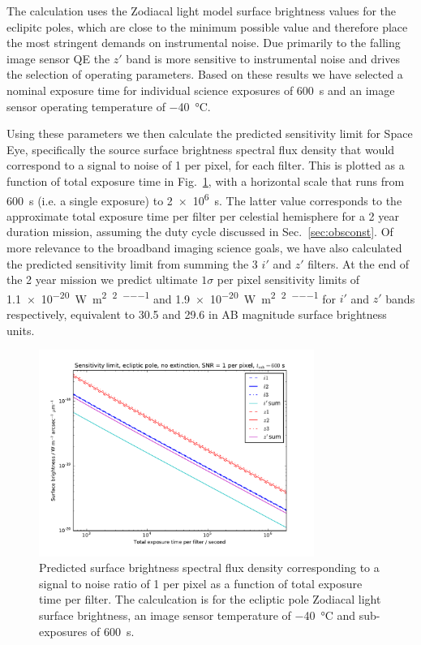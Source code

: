 \documentclass[]{iac}
\begin{document}
The calculation uses the Zodiacal light model surface brightness values for the eclipitc poles, which are close to the
minimum possible value and therefore place the most stringent demands on instrumental noise. Due primarily to the
falling image sensor QE the $z'$ band is more sensitive to instrumental noise and drives the selection of operating
parameters. Based on these results we have selected a nominal exposure time for individual science exposures of
\SI{600}{\second} and an image sensor operating temperature of \SI{-40}{\celsius}.

Using these parameters we then calculate the predicted sensitivity limit for Space Eye, specifically the source surface
brightness spectral flux density that would correspond to a signal to noise of 1 per pixel, for each filter. This is
plotted as a function of total exposure time in Fig.~\ref{fig:sens}, with a horizontal scale that runs from
\SI{600}{\second} (i.e. a single exposure) to \SI{2e6}{\second}. The latter value corresponds to the approximate total
exposure time per filter per celestial hemisphere for a 2 year duration mission, assuming the duty cycle discussed in
Sec.~\ref{sec:obsconst}. Of more relevance to the broadband imaging science goals, we have also calculated the predicted
sensitivity limit from summing the 3 $i'$ and $z'$ filters. At the end of the 2 year mission we predict ultimate
$1\sigma$ per pixel sensitivity limits of \SI{1.1e-20}{\watt\per\metre\squared\per\tarcsecond\squared\per\micron} and
\SI{1.9e-20}{\watt\per\metre\squared\per\tarcsecond\squared\per\micron} for $i'$ and $z'$ bands respectively, equivalent
to 30.5 and 29.6 in AB magnitude surface brightness units.

\begin{figure}[tbp] \center \includegraphics[width=0.8\textwidth]{figures/sens.pdf} \caption{\label{fig:sens}Predicted
surface brightness spectral flux density corresponding to a signal to noise ratio of 1 per pixel as a function of total
exposure time per filter. The calculcation is for the ecliptic pole Zodiacal light surface brightness, an image sensor
temperature of \SI{-40}{\celsius} and sub-exposures of \SI{600}{\second}.} \end{figure}
\end{document}
